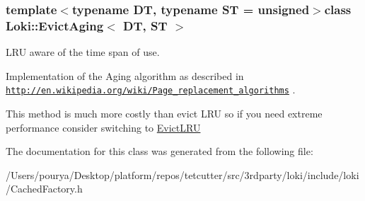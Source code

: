 \subsubsection*{template$<$typename D\+T, typename S\+T = unsigned$>$class Loki\+::\+Evict\+Aging$<$ D\+T, S\+T $>$}

L\+R\+U aware of the time span of use. 

Implementation of the Aging algorithm as described in \href{http://en.wikipedia.org/wiki/Page_replacement_algorithms}{\tt http\+://en.\+wikipedia.\+org/wiki/\+Page\+\_\+replacement\+\_\+algorithms} .

This method is much more costly than evict L\+R\+U so if you need extreme performance consider switching to \hyperlink{classLoki_1_1EvictLRU}{Evict\+L\+R\+U} 

The documentation for this class was generated from the following file\+:\begin{DoxyCompactItemize}
\item 
/\+Users/pourya/\+Desktop/platform/repos/tetcutter/src/3rdparty/loki/include/loki/Cached\+Factory.\+h\end{DoxyCompactItemize}
